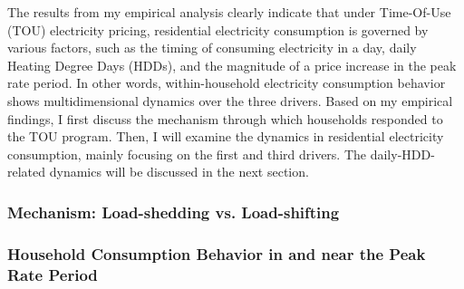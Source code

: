 The results from my empirical analysis clearly indicate that under Time-Of-Use (TOU) electricity pricing, residential electricity consumption is governed by various factors, such as the timing of consuming electricity in a day, daily Heating Degree Days (HDDs), and the magnitude of a price increase in the peak rate period. In other words, within-household electricity consumption behavior shows multidimensional dynamics over the three drivers. Based on my empirical findings, I first discuss the mechanism through which households responded to the TOU program. Then, I will examine the dynamics in residential electricity consumption, mainly focusing on the first and third drivers. The daily-HDD-related dynamics will be discussed in the next section. 

\subsubsection{Mechanism: Load-shedding vs. Load-shifting}
\label{Sub-subsection:Mechanism}



\subsubsection{Household Consumption Behavior in and near the Peak Rate Period}
\label{Sub-subsection:Household-Consumption-Behavior-in-and-near-the-Peak-Rate-Period}
